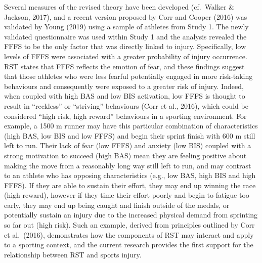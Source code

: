 \documentclass[man,floatsintext]{apa6}
\begin{document}
Several measures of the revised theory have been developed (cf.~Walker \& Jackson, 2017), and a recent version proposed by Corr and Cooper (2016) was validated by Young (2019) using a sample of athletes from Study 1.
The newly validated questionnaire was used within Study 1 and the analysis revealed the FFFS to be the only factor that was directly linked to injury.
Specifically, low levels of FFFS were associated with a greater probability of injury occurrence. RST states that FFFS reflects the emotion of fear, and these findings suggest that those athletes who were less fearful potentially engaged in more risk-taking behaviours and consequently were exposed to a greater risk of injury. Indeed, when coupled with high BAS and low BIS activation, low FFFS is thought to result in \enquote{reckless} or \enquote{striving} behaviours (Corr et al., 2016), which could be considered \enquote{high risk, high reward} behaviours in a sporting environment.
For example, a 1500 m runner may have this particular combination of characteristics (high BAS, low BIS and low FFFS) and begin their sprint finish with 600 m still left to run.
Their lack of fear (low FFFS) and anxiety (low BIS) coupled with a strong motivation to succeed (high BAS) mean they are feeling positive about making the move from a reasonably long way still left to run, and may contrast to an athlete who has opposing characteristics (e.g., low BAS, high BIS and high FFFS).
If they are able to sustain their effort, they may end up winning the race (high reward), however if they time their effort poorly and begin to fatigue too early, they may end up being caught and finish outside of the medals, or potentially sustain an injury due to the increased physical demand from sprinting so far out (high risk).
Such an example, derived from principles outlined by Corr et al.~(2016), demonstrates how the components of RST may interact and apply to a sporting context, and the current research provides the first support for the relationship between RST and sports injury.
\end{document}
